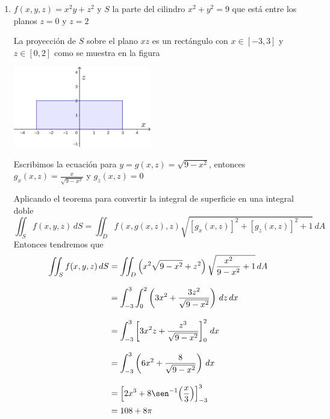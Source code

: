 \documentclass{article}
\begin{document}
\begin{enumerate}
{            \begin{enumerate}
            \item{
                $f(x,y,z) = x^2y + z^2$ y $S$ la parte del cilindro
                $x^2 + y^2 = 9$ que está entre los planos $z=0$ y $z=2$

                \color{azul}
                La proyección de $S$ sobre el plano $xz$ es un rectángulo con
                $x\in [-3,3]$ y $z\in [0,2]$ como se muestra en la figura
                \begin{center}
                    \includegraphics[width=6cm]{img/5a.png}
                \end{center}
                Escribimos la ecuación para $y=g(x,z)=\sqrt{9-x^2}$, entonces
                $\displaystyle g_x(x,z)=\frac{x}{\sqrt{9-x^2}}$ y
                $\displaystyle g_z(x,z)=0$

                Aplicando el teorema para convertir la integral de superficie
                en una integral doble
                \[
                    \displaystyle \iint_{S}{f(x,y,z)\,dS}
                    =\iint_{D}{
                        f(x,g(x,z), z)
                        \sqrt{\left[g_x(x,z)\right]^2+\left[g_z(x,z)\right]^2+1}
                    \,dA}
                \]
                Entonces tendremos que
                \begin{align*}
                    \iint_{S}{f(x,y,z)\,dS}
                    &= \iint_{D}{\left(
                        x^2 \sqrt{9-x^2}+z^2
                    \right)
                    \sqrt{
                        \frac{x^2}{9-x^2}+1
                    }
                    \,dA}\\[.3cm]
                    &= \int_{-3}^{3}{
                        \int_{0}^{2}{
                            \left(
                                3x^2+\frac{3z^2}{\sqrt{9-x^2}}
                            \right)
                        \,dz}
                    \,dx}\\[.3cm]
                    &= \int_{-3}^{3}{
                        \left[
                            3x^2z+\frac{z^3}{\sqrt{9-x^2}}
                        \right]_{0}^{2}
                    \,dx}\\[.3cm]
                    &= \int_{-3}^{3}{
                        \left(
                            6x^2+\frac{8}{\sqrt{9-x^2}}
                        \right)
                    \,dx}\\[.3cm]
                    &= \left[
                        2x^3+8\sen^{-1}{\left(\frac{x}{3}\right)}
                    \right]_{-3}^{3}\\
                    &= 108 + 8\pi
                \end{align*}
            }


\end{enumerate}}
\end{enumerate}
\end{document}
